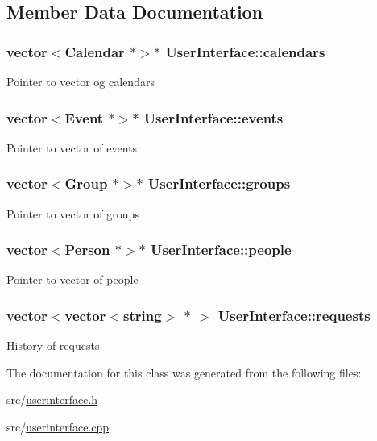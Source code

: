\subsection{Member Data Documentation}
\hypertarget{classUserInterface_abd1f3233d3e666415f6cdf8458b50faa}{
\subsubsection[{calendars}]{\setlength{\rightskip}{0pt plus 5cm}vector$<${\bf Calendar} $\ast$$>$$\ast$ {\bf UserInterface::calendars}}}
\label{df/de1/classUserInterface_abd1f3233d3e666415f6cdf8458b50faa}
Pointer to vector og calendars \hypertarget{classUserInterface_ae3370dc0d02c19b4b1cc7c47221c2bfa}{
\subsubsection[{events}]{\setlength{\rightskip}{0pt plus 5cm}vector$<${\bf Event} $\ast$$>$$\ast$ {\bf UserInterface::events}}}
\label{df/de1/classUserInterface_ae3370dc0d02c19b4b1cc7c47221c2bfa}
Pointer to vector of events \hypertarget{classUserInterface_a12676e629660c43c63eb5b01c5c19bc3}{
\subsubsection[{groups}]{\setlength{\rightskip}{0pt plus 5cm}vector$<${\bf Group} $\ast$$>$$\ast$ {\bf UserInterface::groups}}}
\label{df/de1/classUserInterface_a12676e629660c43c63eb5b01c5c19bc3}
Pointer to vector of groups \hypertarget{classUserInterface_a3d0914e9d2ba661bc3691397c695287e}{
\subsubsection[{people}]{\setlength{\rightskip}{0pt plus 5cm}vector$<${\bf Person} $\ast$$>$$\ast$ {\bf UserInterface::people}}}
\label{df/de1/classUserInterface_a3d0914e9d2ba661bc3691397c695287e}
Pointer to vector of people \hypertarget{classUserInterface_af1cb3bd8de564e4610d863937986d60e}{
\subsubsection[{requests}]{\setlength{\rightskip}{0pt plus 5cm}vector$<$vector$<$string$>$ $\ast$ $>$ {\bf UserInterface::requests}}}
\label{df/de1/classUserInterface_af1cb3bd8de564e4610d863937986d60e}
History of requests 

The documentation for this class was generated from the following files:\begin{DoxyCompactItemize}
\item 
src/\hyperlink{userinterface_8h}{userinterface.h}\item 
src/\hyperlink{userinterface_8cpp}{userinterface.cpp}\end{DoxyCompactItemize}
